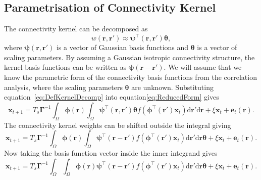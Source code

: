 \documentclass[]{article}
\begin{document}
\subsection{Parametrisation of Connectivity Kernel}
The connectivity kernel can be decomposed as 
\begin{equation}\label{eq:DefKernelDecomp}
	 w\left(\mathbf{r},\mathbf{r}'\right) \approx \boldsymbol{\psi}^\top\left(\mathbf{r},\mathbf{r}'\right) \boldsymbol{\theta},
\end{equation}
where $\boldsymbol{\psi}(\mathbf{r},\mathbf{r}')$ is a vector of Gaussian basis functions and $\boldsymbol{\theta}$ is a vector of scaling parameters. By assuming a Gaussian isotropic connectivity structure, the kernel basis functions can be written as $\boldsymbol{\psi}(\mathbf{r}-\mathbf{r}')$. We will assume that we know the parametric form of the connectivity basis functions from the correlation analysis, where the scaling parameters $\boldsymbol{\theta}$ are unknown.
Substituting equation~\ref{eq:DefKernelDecomp} into equation\ref{eq:ReducedForm} gives
\begin{equation}\label{eq:KernelDecompForm}
	 \mathbf{x}_{t+1} = T_s\boldsymbol{\Gamma}^{-1}
	 \int_\Omega \boldsymbol{\phi}(\mathbf{r}) 
	 \int_\Omega \boldsymbol{\psi}^\top\left(\mathbf{r},\mathbf{r}'\right) \boldsymbol{\theta} f(\boldsymbol{\phi}^{\top} (\mathbf{r}')\mathbf{x}_t) \textrm{d}\mathbf{r}' \textrm{d}\mathbf{r} 
	 + \xi\mathbf{x}_t + \mathbf{e}_t(\mathbf{r}).
\end{equation}
The connectivity kernel weights can be shifted outside the integral giving
\begin{equation}
	 \mathbf{x}_{t+1} = T_s\boldsymbol{\Gamma}^{-1}
	 \int_\Omega \boldsymbol{\phi}(\mathbf{r}) 
	 \int_\Omega \boldsymbol{\psi}^{\top} (\mathbf{r}-\mathbf{r}')f(\boldsymbol{\phi}^{\top}(\mathbf{r}')\mathbf{x}_t) \textrm{d}\mathbf{r}' \textrm{d}\mathbf{r} \boldsymbol{\theta}  
	 + \xi\mathbf{x}_t + \mathbf{e}_t(\mathbf{r}).
\end{equation}
Now taking the basis function vector inside the inner integrand gives
\begin{equation}\label{eq:ReucedFormWithKernelDecomp}
	 \mathbf{x}_{t+1} = T_s\boldsymbol{\Gamma}^{-1}
	 \int_\Omega \int_\Omega \boldsymbol{\phi}(\mathbf{r})\boldsymbol{\psi}^{\top} (\mathbf{r}-\mathbf{r}')f(\boldsymbol{\phi}^{\top}(\mathbf{r}')\mathbf{x}_t) \textrm{d}\mathbf{r}' \textrm{d}\mathbf{r} \boldsymbol{\theta}  
	 + \xi\mathbf{x}_t + \mathbf{e}_t(\mathbf{r}).
\end{equation}
\end{document}
